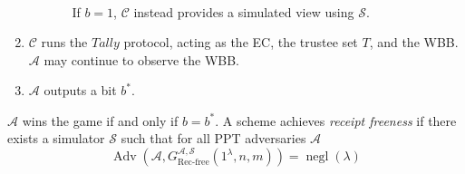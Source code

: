 \documentclass[12pt,a4paper]{article}
\DeclareMathOperator{\negl}{\text{negl}}
\DeclareMathOperator{\Adv}{\text{Adv}}
\theoremstyle{definition}
\begin{document}
\begin{definition}
\begin{enumerate}
\begin{itemize}
\begin{enumerate}
\begin{gather*}
                \end{gather*}
                If $b=1$, $\mathcal{C}$ instead provides a simulated view using $\mathcal{S}$.
            \end{enumerate}
        \end{itemize}
        \item $\mathcal{C}$ runs the $\mathit{Tally}$ protocol, acting as the EC, the trustee set $T$, and the WBB. $\mathcal{A}$ may continue to observe the WBB.
        \item $\mathcal{A}$ outputs a bit $b^*$.
    \end{enumerate}
    $\mathcal{A}$ wins the game if and only if $b=b^*$. A scheme achieves \textit{receipt freeness} if there exists a simulator $\mathcal{S}$ such that for all PPT adversaries $\mathcal{A}$
    $$\Adv\left(\mathcal{A}, G^{\mathcal{A},\mathcal{S}}_{\text{Rec-free}}(1^\lambda, n, m)\right)=\negl(\lambda)$$
\end{definition}
\end{document}
